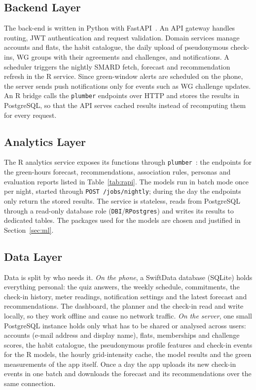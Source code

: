 \documentclass[conference]{IEEEtran}
\newcommand{\pkg}[1]{\texttt{#1}}
\begin{document}
\subsection{Backend Layer}
The back-end is written in Python with FastAPI~\cite{fastapi}. An API gateway handles routing, JWT authentication and request validation. Domain services manage accounts and flats, the habit catalogue, the daily upload of pseudonymous check-ins, WG groups with their agreements and challenges, and notifications. A scheduler triggers the nightly SMARD fetch, forecast and recommendation refresh in the R service. Since green-window alerts are scheduled on the phone, the server sends push notifications only for events such as WG challenge updates. An R bridge calls the \pkg{plumber} endpoints over HTTP and stores the results in PostgreSQL, so that the API serves cached results instead of recomputing them for every request.

\subsection{Analytics Layer}
The R analytics service exposes its functions through \pkg{plumber}~\cite{plumber}: the endpoints for the green-hours forecast, recommendations, association rules, personas and evaluation reports listed in Table~\ref{tab:rapi}. The models run in batch mode once per night, started through \texttt{POST /jobs/nightly}; during the day the endpoints only return the stored results. The service is stateless, reads from PostgreSQL through a read-only database role (\pkg{DBI}/\pkg{RPostgres}) and writes its results to dedicated tables. The packages used for the models are chosen and justified in Section~\ref{sec:ml}.

\subsection{Data Layer}
\label{sec:data}
Data is split by who needs it. \emph{On the phone}, a SwiftData database (SQLite) holds everything personal: the quiz answers, the weekly schedule, commitments, the check-in history, meter readings, notification settings and the latest forecast and recommendations. The dashboard, the planner and the check-in read and write locally, so they work offline and cause no network traffic. \emph{On the server}, one small PostgreSQL instance holds only what has to be shared or analysed across users: accounts (e-mail address and display name), flats, memberships and challenge scores, the habit catalogue, the pseudonymous profile features and check-in events for the R models, the hourly grid-intensity cache, the model results and the green measurements of the app itself. Once a day the app uploads its new check-in events in one batch and downloads the forecast and its recommendations over the same connection.
\end{document}

